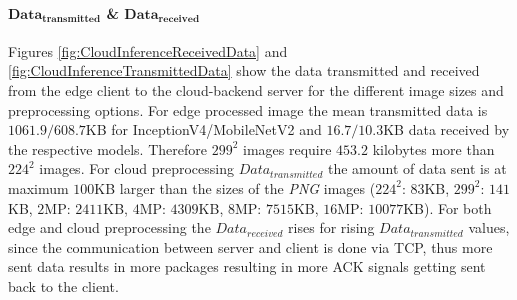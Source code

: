 \paragraph{$\mathbf{Data_{transmitted}}$ \& $\mathbf{Data_{received}}$}
Figures \ref{fig:CloudInferenceReceivedData} and \ref{fig:CloudInferenceTransmittedData} show the data transmitted and received from the edge client to the cloud-backend server for the different image sizes and preprocessing options.
For edge processed image the mean transmitted data is $1061.9/608.7$KB for InceptionV4/MobileNetV2 and $16.7/10.3$KB data received by the respective models.
Therefore $299^2$ images require $453.2$ kilobytes more than $224^2$ images.
For cloud preprocessing $Data_{transmitted}$ the amount of data sent is at maximum $100$KB larger than the sizes of the \emph{PNG} images ($224^2$: $83$KB, $299^2$: $141$KB, $2$MP: $2411$KB, $4$MP: $4309$KB, $8$MP: $7515$KB,  $16$MP: $10077$KB).
For both edge and cloud preprocessing the $Data_{received}$ rises for rising $Data_{transmitted}$ values, since the communication between server and client is done via TCP, thus more sent data results in more packages resulting in more ACK signals getting sent back to the client.


